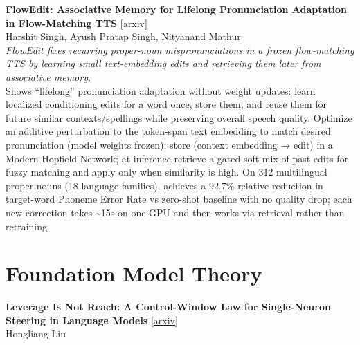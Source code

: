 \documentclass[12pt,letterpaper]{article}
\begin{document}
\medskip

{\small\textbf{FlowEdit: Associative Memory for Lifelong Pronunciation Adaptation in Flow-Matching TTS}} {\scriptsize[\href{https://arxiv.org/abs/2606.20518}{arxiv}]}\\
{\scriptsize Harshit Singh, Ayush Pratap Singh, Nityanand Mathur}\\

{\small\textit{FlowEdit fixes recurring proper-noun mispronunciations in a frozen flow-matching TTS by learning small text-embedding edits and retrieving them later from associative memory.}}\\[1pt]
{\footnotesize Shows ``lifelong'' pronunciation adaptation without weight updates: learn localized conditioning edits for a word once, store them, and reuse them for future similar contexts/spellings while preserving overall speech quality. Optimize an additive perturbation to the token-span text embedding to match desired pronunciation (model weights frozen); store (context embedding → edit) in a Modern Hopfield Network; at inference retrieve a gated soft mix of past edits for fuzzy matching and apply only when similarity is high. On 312 multilingual proper nouns (18 language families), achieves a 92.7\% relative reduction in target-word Phoneme Error Rate vs zero-shot baseline with no quality drop; each new correction takes \textasciitilde{}15s on one GPU and then works via retrieval rather than retraining.}

\medskip


\section*{Foundation Model Theory}

{\small\textbf{Leverage Is Not Reach: A Control-Window Law for Single-Neuron Steering in Language Models}} {\scriptsize[\href{https://arxiv.org/abs/2606.19831}{arxiv}]}\\
{\scriptsize Hongliang Liu}\\
\end{document}

